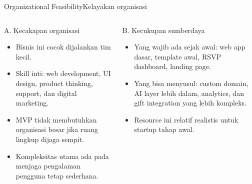 \documentclass[aspectratio=169,11pt]{beamer}
\begin{document}
\begin{frame}{Organizational Feasibility}{Kelayakan organisasi}
\begin{columns}[T,totalwidth=\textwidth]
\begin{block}{A. Kecakapan organisasi}
\begin{itemize}
  \item Bisnis ini cocok dijalankan tim kecil.
  \item Skill inti: web development, UI design, product thinking, support, dan digital marketing.
  \item MVP tidak membutuhkan organisasi besar jika ruang lingkup dijaga sempit.
  \item Kompleksitas utama ada pada menjaga pengalaman pengguna tetap sederhana.
\end{itemize}
\end{block}

\begin{block}{B. Kecukupan sumberdaya}
\begin{itemize}
  \item Yang wajib ada sejak awal: web app dasar, template awal, RSVP dashboard, landing page.
  \item Yang bisa menyusul: custom domain, AI layer lebih dalam, analytics, dan gift integration yang lebih kompleks.
  \item Resource ini relatif realistis untuk startup tahap awal.
\end{itemize}
\end{block}
\end{columns}
\end{frame}
\end{document}
